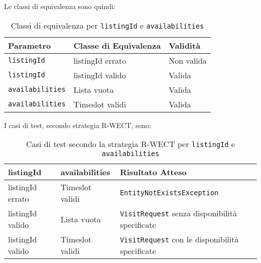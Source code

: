 Le classi di equivalenza sono quindi:
\begin{table}[h!]
    \centering
    \renewcommand{\arraystretch}{1.4}
    \begin{tabularx}{\textwidth}{|X|X|X|}
    \hline
    \textbf{Parametro} & \textbf{Classe di Equivalenza} & \textbf{Validità} \\
    \hline
    \texttt{listingId} & listingId errato & Non valida \\
    \hline
    \texttt{listingId} & listingId valido & Valida \\
    \hline
    \texttt{availabilities} & Lista vuota & Valida \\
    \hline
    \texttt{availabilities} & Timeslot validi & Valida \\
    \hline
    \end{tabularx}
    \caption{Classi di equivalenza per \texttt{listingId} e \texttt{availabilities}}
\end{table}

I casi di test, secondo strategia R-WECT, sono:
\begin{table}[h!]
    \centering
    \renewcommand{\arraystretch}{1.4}
    \begin{tabularx}{\textwidth}{|X|X|X|}
    \hline
    \textbf{listingId} & \textbf{availabilities} & \textbf{Risultato Atteso} \\
    \hline
    listingId errato & Timeslot validi & \texttt{EntityNotExistsException} \\
    \hline
    listingId valido & Lista vuota & \texttt{VisitRequest} senza disponibilità specificate \\
    \hline
    listingId valido & Timeslot validi & \texttt{VisitRequest} con le disponibilità specificate \\
    \hline
    \end{tabularx}
    \caption{Casi di test secondo la strategia R-WECT per \texttt{listingId} e \texttt{availabilities}}
    \end{table}

\newpage
